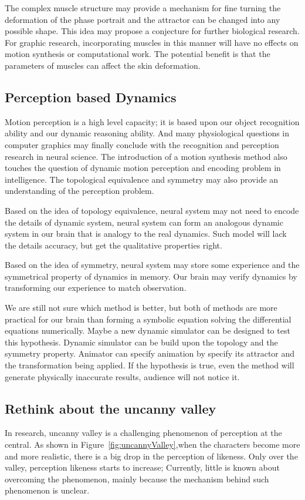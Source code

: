 The complex muscle structure may provide a mechanism for fine turning the deformation of the phase portrait and  the attractor can be changed into any possible shape.
This idea may propose a conjecture for further biological research.
For graphic research, incorporating muscles in this manner will have no effects on motion synthesis or computational work.
The potential benefit is that the parameters of muscles can affect the skin deformation.



\subsection{Perception based Dynamics}
Motion perception is a high level capacity; it is based upon our object recognition ability and our dynamic reasoning ability.
And many physiological questions in computer graphics may finally conclude with the recognition and perception research in neural science.
The introduction of a motion synthesis method also touches the question of dynamic motion perception and encoding problem in intelligence.
The topological equivalence and symmetry may also provide an understanding of the perception problem.

Based on the idea of topology equivalence, neural system may not need to encode the details of dynamic system, neural system can form an analogous dynamic system in our brain that is analogy to the real dynamics.
Such model will lack the details accuracy, but get the qualitative properties right.

Based on the idea of symmetry, neural system may store some experience and the symmetrical property of dynamics in memory.
Our brain may verify dynamics by transforming our experience to match observation.


We are still not sure which method is better, but both of methods are more practical for our brain than forming a symbolic equation solving the differential equations numerically.
Maybe a new dynamic simulator can be designed to test this hypothesis.
Dynamic simulator can be build upon the topology and the symmetry property.
Animator can specify animation by specify its attractor and the transformation being  applied.
If the hypothesis is true, even the method will generate physically inaccurate results, audience will not notice it.

\subsection{Rethink about the uncanny valley}
In \cms research, uncanny valley is a challenging phenomenon of perception at the  central. 
As shown in Figure~\ref{fig:uncannyValley},when the characters  become more and more realistic, there is a big drop in the perception of likeness.
Only over the valley, perception likeness starts to increase;
Currently, little is known about overcoming the phenomenon,
mainly because the mechanism behind such phenomenon is unclear.

